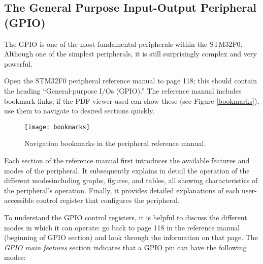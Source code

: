 \documentclass[11pt,fleqn]{book} %
\begin{document}
\subsection{The General Purpose Input-Output Peripheral (GPIO)}


The GPIO is one of the most fundamental peripherals within the STM32F0. Although one of the simplest peripherals, it is still surprisingly complex and very powerful.

Open the STM32F0 peripheral reference manual to page 118; this should contain the heading ``General-purpose I/Os (GPIO).'' The reference manual includes bookmark links; if the PDF viewer used can show these (see Figure \vref{bookmarks}), use them to navigate to desired sections quickly.

\begin{figure}[]
    \centering\texttt{[image: bookmarks]}
    \caption{Navigation bookmarks in the peripheral reference manual.}
    \label{bookmarks}
\end{figure}

Each section of the reference manual first introduces the available features and modes of the peripheral. It subsequently explains in detail the operation of the different modes\textemdash including graphs, figures, and tables, all showing characteristics of the peripheral's operation. Finally, it provides detailed explanations of each user-accessible control register that configures the peripheral.

To understand the GPIO control registers, it is helpful to discuss the different modes in which it can operate: go back to page 118 in the reference manual (beginning of GPIO section) and look through the information on that page.
\newpage\noindent
The \textit{GPIO main features} section indicates that a GPIO pin can have the following modes:
\end{document}
